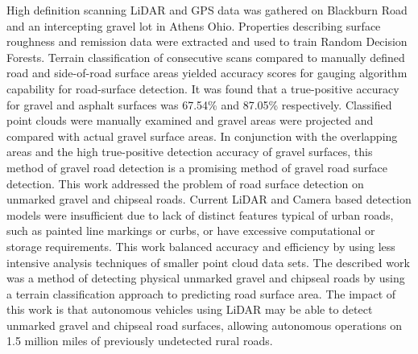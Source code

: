 \documentclass[journal,onecolumn]{IEEEtran}
\begin{document}
	{High definition scanning LiDAR and GPS data was gathered on Blackburn Road and an intercepting gravel lot in Athens Ohio. Properties describing surface roughness and remission data were extracted and used to train Random Decision Forests. Terrain classification of consecutive scans compared to manually defined road and side-of-road surface areas yielded accuracy scores for gauging algorithm capability for road-surface detection. It was found that a true-positive accuracy for gravel and asphalt surfaces was 67.54\% and 87.05\% respectively. Classified point clouds were manually examined and gravel areas were projected and compared with actual gravel surface areas. In conjunction with the overlapping areas and the high true-positive detection accuracy of gravel surfaces, this method of gravel road detection is a promising method of gravel road surface detection. This work addressed the problem of road surface detection on unmarked gravel and chipseal roads. Current LiDAR and Camera based detection models were insufficient due to lack of distinct features typical of urban roads, such as painted line markings or curbs, or have excessive computational or storage requirements. This work balanced accuracy and efficiency by using less intensive analysis techniques of smaller point cloud data sets. The described work was a method of detecting physical unmarked gravel and chipseal roads by using a terrain classification approach to predicting road surface area. The impact of this work is that autonomous vehicles using LiDAR may be able to detect unmarked gravel and chipseal road surfaces, allowing autonomous operations on 1.5 million miles of previously undetected rural roads.} 
	
	
%
\IEEEpeerreviewmaketitle




\end{document}
